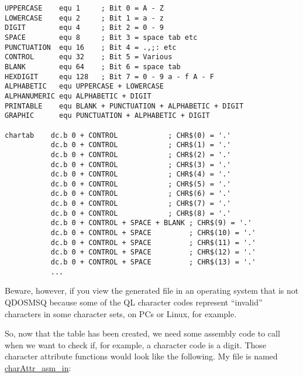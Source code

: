\begin{lstlisting}[caption={Extract of the generated file \protect\url{characters_asm_in}}]
UPPERCASE    equ 1     ; Bit 0 = A - Z
LOWERCASE    equ 2     ; Bit 1 = a - z
DIGIT        equ 4     ; Bit 2 = 0 - 9
SPACE        equ 8     ; Bit 3 = space tab etc
PUNCTUATION  equ 16    ; Bit 4 = .,;: etc
CONTROL      equ 32    ; Bit 5 = Various
BLANK        equ 64    ; Bit 6 = space tab
HEXDIGIT     equ 128   ; Bit 7 = 0 - 9 a - f A - F
ALPHABETIC   equ UPPERCASE + LOWERCASE
ALPHANUMERIC equ ALPHABETIC + DIGIT
PRINTABLE    equ BLANK + PUNCTUATION + ALPHABETIC + DIGIT
GRAPHIC      equ PUNCTUATION + ALPHABETIC + DIGIT

chartab    dc.b 0 + CONTROL            ; CHR$(0) = '.' 
           dc.b 0 + CONTROL            ; CHR$(1) = '.'
           dc.b 0 + CONTROL            ; CHR$(2) = '.' 
           dc.b 0 + CONTROL            ; CHR$(3) = '.' 
           dc.b 0 + CONTROL            ; CHR$(4) = '.' 
           dc.b 0 + CONTROL            ; CHR$(5) = '.' 
           dc.b 0 + CONTROL            ; CHR$(6) = '.' 
           dc.b 0 + CONTROL            ; CHR$(7) = '.' 
           dc.b 0 + CONTROL            ; CHR$(8) = '.' 
           dc.b 0 + CONTROL + SPACE + BLANK ; CHR$(9) = '.' 
           dc.b 0 + CONTROL + SPACE         ; CHR$(10) = '.' 
           dc.b 0 + CONTROL + SPACE         ; CHR$(11) = '.' 
           dc.b 0 + CONTROL + SPACE         ; CHR$(12) = '.' 
           dc.b 0 + CONTROL + SPACE         ; CHR$(13) = '.'
           ...
\end{lstlisting}

Beware, however, if you view the generated file in an operating system
that is not QDOSMSQ because some of the QL character codes represent
``invalid'' characters in some character sets, on PCs or Linux,
for example. 

So, now that the table has been created, we need some assembly code
to call when we want to check if, for example, a character code is
a digit. Those character attribute functions would look like the following.
My file is named \url{charAttr_asm_in}:

